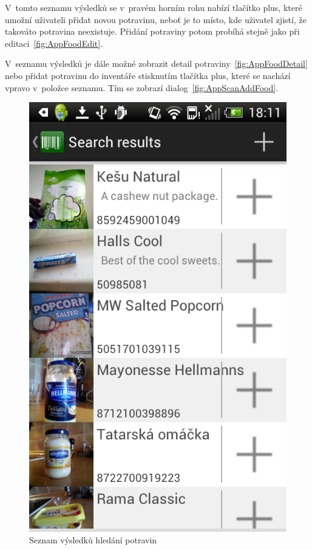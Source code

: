 \documentclass[thesis=B,czech]{FITthesis}[2013/10/20]
\begin{document}
V~tomto seznamu výsledků se v~pravém horním rohu nabízí tlačítko plus, které umožní uživateli přidat novou potravinu, neboť je to místo, kde uživatel zjistí, že takováto potravina neexistuje. Přidání potraviny potom probíhá stejně jako při editaci~\ref{fig:AppFoodEdit}.

V~seznamu výsledků je dále možné zobrazit detail potraviny~\ref{fig:AppFoodDetail} nebo přidat potravinu do inventáře stisknutím tlačítka plus, které se nachází vpravo v~položce seznamu. Tím se zobrazí dialog~\ref{fig:AppScanAddFood}.

\begin{figure}[H]
  \centering
  \includegraphics[scale=0.4]{screenshots/app_search_results.png}
  \caption{Seznam výsledků hledání potravin}
  \label{fig:AppSearchResults}
\end{figure}
\end{document}
